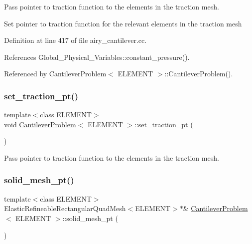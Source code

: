 Pass pointer to traction function to the elements in the traction mesh. 

Set pointer to traction function for the relevant elements in the traction mesh 

Definition at line 417 of file airy\+\_\+cantilever.\+cc.



References Global\+\_\+\+Physical\+\_\+\+Variables\+::constant\+\_\+pressure().



Referenced by Cantilever\+Problem$<$ E\+L\+E\+M\+E\+N\+T $>$\+::\+Cantilever\+Problem().

\mbox{\label{classCantileverProblem_a96a9716947a15930f3881fcec6d448e2}} 
\subsubsection{\texorpdfstring{set\+\_\+traction\+\_\+pt()}{set\_traction\_pt()}\hspace{0.1cm}{\footnotesize\ttfamily [2/2]}}
{\footnotesize\ttfamily template$<$class E\+L\+E\+M\+E\+NT$>$ \\
void \hyperlink{classCantileverProblem}{Cantilever\+Problem}$<$ E\+L\+E\+M\+E\+NT $>$\+::set\+\_\+traction\+\_\+pt (\begin{DoxyParamCaption}{ }\end{DoxyParamCaption})\hspace{0.3cm}{\ttfamily [private]}}



Pass pointer to traction function to the elements in the traction mesh. 

\mbox{\label{classCantileverProblem_a26843782873897ee5e45647d17204b86}} 
\subsubsection{\texorpdfstring{solid\+\_\+mesh\+\_\+pt()}{solid\_mesh\_pt()}\hspace{0.1cm}{\footnotesize\ttfamily [1/3]}}
{\footnotesize\ttfamily template$<$class E\+L\+E\+M\+E\+NT$>$ \\
Elastic\+Refineable\+Rectangular\+Quad\+Mesh$<$E\+L\+E\+M\+E\+NT$>$$\ast$\& \hyperlink{classCantileverProblem}{Cantilever\+Problem}$<$ E\+L\+E\+M\+E\+NT $>$\+::solid\+\_\+mesh\+\_\+pt (\begin{DoxyParamCaption}{ }\end{DoxyParamCaption})\hspace{0.3cm}{\ttfamily [inline]}}




